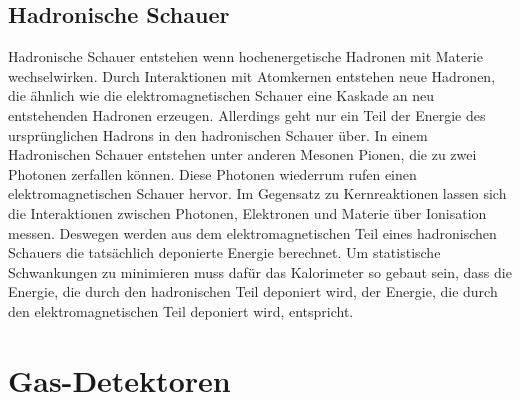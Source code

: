 \subsection{Hadronische Schauer}
Hadronische Schauer entstehen wenn hochenergetische Hadronen mit Materie wechselwirken. Durch Interaktionen mit Atomkernen entstehen neue Hadronen, die ähnlich wie die elektromagnetischen Schauer eine Kaskade an neu entstehenden Hadronen erzeugen. Allerdings geht nur ein Teil der Energie des ursprünglichen Hadrons in den hadronischen Schauer über. In einem Hadronischen Schauer entstehen unter anderen Mesonen Pionen, die zu zwei Photonen zerfallen können. Diese Photonen wiederrum rufen einen elektromagnetischen Schauer hervor. Im Gegensatz zu Kernreaktionen lassen sich die Interaktionen zwischen Photonen, Elektronen und Materie über Ionisation messen. Deswegen werden aus dem elektromagnetischen Teil eines hadronischen Schauers die tatsächlich deponierte Energie berechnet. Um statistische Schwankungen zu minimieren muss dafür das Kalorimeter so gebaut sein, dass die Energie, die durch den hadronischen Teil deponiert wird, der Energie, die durch den elektromagnetischen Teil deponiert wird, entspricht.

\section{Gas-Detektoren}
